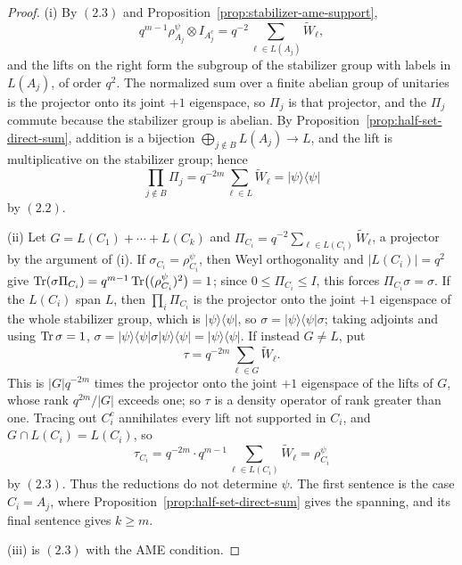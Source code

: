 \begin{proof}
(i) By \((2.3)\) and Proposition~\ref{prop:stabilizer-ame-support},
\[
 q^{m-1}\rho^\psi_{A_j}\otimes I_{A_j^c}
 =q^{-2}\sum_{\ell\in L(A_j)}\widetilde W_\ell ,
\]
and the lifts on the right form the subgroup of the stabilizer group with
labels in \(L(A_j)\), of order \(q^2\).  The normalized sum over a finite
abelian group of unitaries is the projector onto its joint \(+1\)
eigenspace, so \(\Pi_j\) is that projector, and the \(\Pi_j\) commute
because the stabilizer group is abelian.  By
Proposition~\ref{prop:half-set-direct-sum}, addition is a bijection
\(\bigoplus_{j\notin B}L(A_j)\to L\), and the lift is multiplicative on
the stabilizer group; hence
\[
 \prod_{j\notin B}\Pi_j
 =q^{-2m}\sum_{\ell\in L}\widetilde W_\ell
 =\lvert\psi\rangle\langle\psi\rvert
\]
by \((2.2)\).

(ii) Let \(G=L(C_1)+\cdots+L(C_k)\) and
\(\Pi_{C_i}=q^{-2}\sum_{\ell\in L(C_i)}\widetilde W_\ell\), a projector
by the argument of (i).  If \(\sigma_{C_i}=\rho^\psi_{C_i}\), then Weyl
orthogonality and \(|L(C_i)|=q^2\) give
\(\operatorname{Tr}(\sigma\Pi_{C_i})=q^{m-1}\operatorname{Tr}\bigl((\rho^\psi_{C_i})^2\bigr)=1\);
since \(0\leq\Pi_{C_i}\leq I\), this forces \(\Pi_{C_i}\sigma=\sigma\).
If the \(L(C_i)\) span \(L\), then \(\prod_i\Pi_{C_i}\) is the projector
onto the joint \(+1\) eigenspace of the whole stabilizer group, which is
\(\lvert\psi\rangle\langle\psi\rvert\), so
\(\sigma=\lvert\psi\rangle\langle\psi\rvert\sigma\); taking adjoints and
using \(\operatorname{Tr}\sigma=1\),
\(\sigma
 =\lvert\psi\rangle\langle\psi\rvert\sigma\lvert\psi\rangle\langle\psi\rvert
 =\lvert\psi\rangle\langle\psi\rvert\).
If instead \(G\neq L\), put
\[
 \tau=q^{-2m}\sum_{\ell\in G}\widetilde W_\ell .
\]
This is \(|G|q^{-2m}\) times the projector onto the joint \(+1\) eigenspace
of the lifts of \(G\), whose rank \(q^{2m}/|G|\) exceeds one; so \(\tau\)
is a density operator of rank greater than one.  Tracing out \(C_i^c\)
annihilates every lift not supported in \(C_i\), and
\(G\cap L(C_i)=L(C_i)\), so
\[
 \tau_{C_i}=q^{-2m}\cdot q^{m-1}\sum_{\ell\in L(C_i)}\widetilde W_\ell
 =\rho^\psi_{C_i}
\]
by \((2.3)\).  Thus the reductions do not determine \(\psi\).  The first
sentence is the case \(C_i=A_j\), where
Proposition~\ref{prop:half-set-direct-sum} gives the spanning, and its
final sentence gives \(k\geq m\).

(iii) is \((2.3)\) with the AME condition.


\end{proof}
